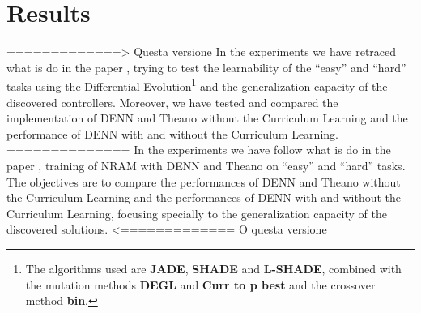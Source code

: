 \section{Results}
=============> Questa versione
In the experiments we have retraced what is do in the paper \cite{NRAM:2016}, trying to test the learnability of the ``easy'' and ``hard'' tasks using the Differential Evolution\footnote{The algorithms used are \textbf{JADE}, \textbf{SHADE} and \textbf{L-SHADE}, combined with the mutation methods \textbf{DEGL} and \textbf{Curr to p best} and the crossover method \textbf{bin}.} and the generalization capacity of the discovered controllers. Moreover, we have tested and compared the implementation of DENN and Theano without the Curriculum Learning and the performance of DENN with and without the Curriculum Learning.\newline
==============\newline
In the experiments we have follow what is do in the paper \cite{NRAM:2016}, training of NRAM with DENN and Theano on ``easy'' and ``hard'' tasks. The objectives are to compare the performances of DENN and Theano without the Curriculum Learning and the performances of DENN with and without the Curriculum Learning, focusing specially to the generalization capacity of the discovered solutions.
<============= O questa versione\newline


